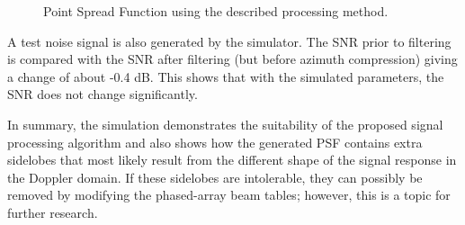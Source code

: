\begin{figure}[h!]
\begin{center}
 \resizebox{\columnwidth}{!}{}
 \caption{Point Spread Function using the described processing method.}
 \label{fg:psf}
 \end{center}
\end{figure}
\par
A test noise signal is also generated by the simulator. The SNR prior to filtering is compared with the SNR after filtering (but before azimuth compression) giving a change of about -0.4 dB. This shows that with the simulated parameters, the SNR does not change significantly.
\par
In summary, the simulation demonstrates the suitability of the proposed signal processing algorithm and also shows how the generated PSF contains extra sidelobes that most likely result from the different shape of the signal response in the Doppler domain. If these sidelobes are intolerable, they can possibly be removed by modifying the phased-array beam tables; however, this is a topic for further research.